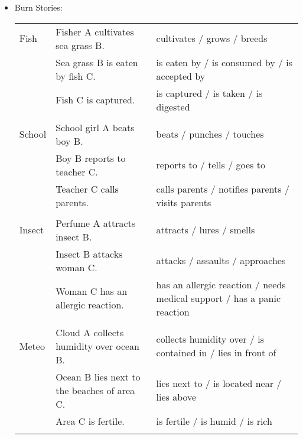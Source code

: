 \begin{itemize}
\begin{longtable}{p{}p{}p{}}
\end{longtable}
\item \normalsize Burn Stories:
\scriptsize
\begin{longtable}{p{}p{}p{}}
Fish & Fisher A cultivates sea grass B. & cultivates / grows / breeds \\   & Sea grass B is eaten by fish C. & is eaten by / is consumed by / is accepted by \\   & Fish C is captured. & is captured / is taken / is digested \\  & & \\ School & School girl A beats boy B. & beats / punches / touches \\   & Boy B reports to teacher C. & reports to / tells / goes to \\   & Teacher C calls parents. & calls parents / notifies parents / visits parents \\  & & \\ Insect & Perfume A attracts insect B. & attracts / lures / smells \\   & Insect B attacks woman C. & attacks / assaults / approaches \\   & Woman C has an allergic reaction. & has an allergic reaction / needs medical support / has a panic reaction \\  & & \\ Meteo & Cloud A collects humidity over ocean B. & collects humidity over / is contained in / lies in front of \\   & Ocean B lies next to the beaches of area C. & lies next to / is located near / lies above \\   & Area C is fertile. & is fertile / is humid / is rich \\  & & \\
\end{longtable}
\end{itemize}
